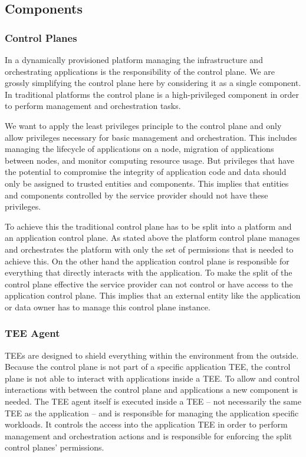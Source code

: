 \subsection{Components}

\subsubsection{Control Planes}

In a dynamically provisioned platform managing the infrastructure and
orchestrating applications is the responsibility of the control plane. We are
grossly simplifying the control plane here by considering it as a single
component. In traditional platforms the control plane is a high-privileged
component in order to perform management and orchestration tasks.

We want to apply the least privileges principle to the control plane and only
allow privileges necessary for basic management and orchestration. This includes
managing the lifecycle of applications on a node, migration of applications
between nodes, and monitor computing resource usage. But privileges that have
the potential to compromise the integrity of application code and data should
only be assigned to trusted entities and components. This implies that entities
and components controlled by the service provider should not have these
privileges.

To achieve this the traditional control plane has to be split into a platform
and an application control plane. As stated above the platform control plane
manages and orchestrates the platform with only the set of permissions that is
needed to achieve this. On the other hand the application control plane is
responsible for everything that directly interacts with the application. To make
the split of the control plane effective the service provider can not control or
have access to the application control plane. This implies that an external
entity like the application or data owner has to manage this control plane
instance.

\subsubsection{TEE Agent}

TEEs are designed to shield everything within the environment from the outside.
Because the control plane is not part of a specific application TEE, the control
plane is not able to interact with applications inside a TEE. To allow and
control interactions with between the control plane and applications a new
component is needed. The TEE agent itself is executed inside a TEE -- not
necessarily the same TEE as the application -- and is responsible for managing
the application specific workloads. It controls the access into the application
TEE in order to perform management and orchestration actions and is responsible
for enforcing the split control planes' permissions.

